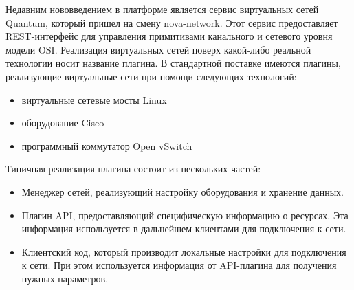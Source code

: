 Недавним нововведением в платформе является сервис виртуальных сетей Quantum, который 
пришел на смену nova-network. Этот сервис предоставляет REST-интерфейс для управления
примитивами канального и сетевого уровня модели OSI. Реализация виртуальных сетей
поверх какой-либо реальной технологии носит название плагина. 
В стандартной поставке имеются плагины, реализующие виртуальные сети при помощи
следующих технологий:
\begin{itemize}
    \item виртуальные сетевые мосты Linux
    \item оборудование Cisco
    \item программный коммутатор Open vSwitch
\end{itemize}

Типичная реализация плагина состоит из нескольких частей:
\begin{itemize}
    \item Менеджер сетей, реализующий настройку оборудования и хранение данных.
    \item Плагин API, предоставляющий специфическую информацию о ресурсах. 
    Эта информация используется в дальнейшем клиентами для подключения к сети.
    \item Клиентский код, который производит локальные настройки для подключения к сети.
    При этом используется информация от API-плагина для получения нужных параметров.
\end{itemize}








